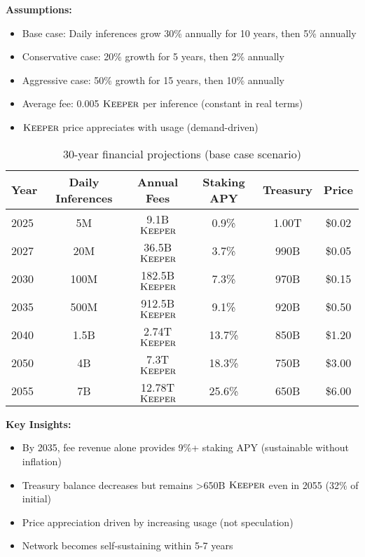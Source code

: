 \documentclass[11pt,letterpaper]{article}
\theoremstyle{definition}
\theoremstyle{remark}
\newcommand{\KEEPER}{\textsc{Keeper}}
\begin{document}
\textbf{Assumptions:}
\begin{itemize}
\item Base case: Daily inferences grow 30\% annually for 10 years, then 5\% annually
\item Conservative case: 20\% growth for 5 years, then 2\% annually
\item Aggressive case: 50\% growth for 15 years, then 10\% annually
\item Average fee: 0.005 $\KEEPER$ per inference (constant in real terms)
\item $\KEEPER$ price appreciates with usage (demand-driven)
\end{itemize}

\begin{table}[h]
\centering
\small
\begin{tabular}{lccccc}
\toprule
\textbf{Year} & \textbf{Daily Inferences} & \textbf{Annual Fees} & \textbf{Staking APY} & \textbf{Treasury} & \textbf{Price} \\
\midrule
2025 & 5M & 9.1B $\KEEPER$ & 0.9\% & 1.00T & \$0.02 \\
2027 & 20M & 36.5B $\KEEPER$ & 3.7\% & 990B & \$0.05 \\
2030 & 100M & 182.5B $\KEEPER$ & 7.3\% & 970B & \$0.15 \\
2035 & 500M & 912.5B $\KEEPER$ & 9.1\% & 920B & \$0.50 \\
2040 & 1.5B & 2.74T $\KEEPER$ & 13.7\% & 850B & \$1.20 \\
2050 & 4B & 7.3T $\KEEPER$ & 18.3\% & 750B & \$3.00 \\
2055 & 7B & 12.78T $\KEEPER$ & 25.6\% & 650B & \$6.00 \\
\bottomrule
\end{tabular}
\caption{30-year financial projections (base case scenario)}
\label{tab:projections}
\end{table}

\textbf{Key Insights:}
\begin{itemize}
\item By 2035, fee revenue alone provides 9\%+ staking APY (sustainable without inflation)
\item Treasury balance decreases but remains >650B $\KEEPER$ even in 2055 (32\% of initial)
\item Price appreciation driven by increasing usage (not speculation)
\item Network becomes self-sustaining within 5-7 years
\end{itemize}
\end{document}
